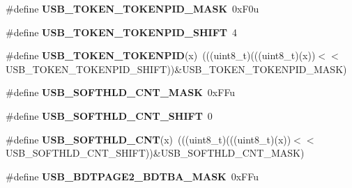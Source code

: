 \begin{DoxyCompactItemize}
\item 
\mbox{\label{group___u_s_b___register___masks_ga8880174ec35cfb684d2bcc6e0d5a52bc}} 
\#define {\bfseries U\+S\+B\+\_\+\+T\+O\+K\+E\+N\+\_\+\+T\+O\+K\+E\+N\+P\+I\+D\+\_\+\+M\+A\+SK}~0x\+F0u
\item 
\mbox{\label{group___u_s_b___register___masks_gae410fcf426d2212be6468703734f6ed9}} 
\#define {\bfseries U\+S\+B\+\_\+\+T\+O\+K\+E\+N\+\_\+\+T\+O\+K\+E\+N\+P\+I\+D\+\_\+\+S\+H\+I\+FT}~4
\item 
\mbox{\label{group___u_s_b___register___masks_ga74fd206a0132343b30c41a2184f18ea0}} 
\#define {\bfseries U\+S\+B\+\_\+\+T\+O\+K\+E\+N\+\_\+\+T\+O\+K\+E\+N\+P\+ID}(x)~(((uint8\+\_\+t)(((uint8\+\_\+t)(x))$<$$<$U\+S\+B\+\_\+\+T\+O\+K\+E\+N\+\_\+\+T\+O\+K\+E\+N\+P\+I\+D\+\_\+\+S\+H\+I\+FT))\&U\+S\+B\+\_\+\+T\+O\+K\+E\+N\+\_\+\+T\+O\+K\+E\+N\+P\+I\+D\+\_\+\+M\+A\+SK)
\item 
\mbox{\label{group___u_s_b___register___masks_gab71f8a7be8b025453facbce8d45b7bcc}} 
\#define {\bfseries U\+S\+B\+\_\+\+S\+O\+F\+T\+H\+L\+D\+\_\+\+C\+N\+T\+\_\+\+M\+A\+SK}~0x\+F\+Fu
\item 
\mbox{\label{group___u_s_b___register___masks_gaf4b663b6276ba642abfdedf79fac92c6}} 
\#define {\bfseries U\+S\+B\+\_\+\+S\+O\+F\+T\+H\+L\+D\+\_\+\+C\+N\+T\+\_\+\+S\+H\+I\+FT}~0
\item 
\mbox{\label{group___u_s_b___register___masks_ga6a373b5dfe5c4aa910fd120cc169a4b9}} 
\#define {\bfseries U\+S\+B\+\_\+\+S\+O\+F\+T\+H\+L\+D\+\_\+\+C\+NT}(x)~(((uint8\+\_\+t)(((uint8\+\_\+t)(x))$<$$<$U\+S\+B\+\_\+\+S\+O\+F\+T\+H\+L\+D\+\_\+\+C\+N\+T\+\_\+\+S\+H\+I\+FT))\&U\+S\+B\+\_\+\+S\+O\+F\+T\+H\+L\+D\+\_\+\+C\+N\+T\+\_\+\+M\+A\+SK)
\item 
\mbox{\label{group___u_s_b___register___masks_ga69407c90a73a26bc60f3f9b75e4bd7c0}} 
\#define {\bfseries U\+S\+B\+\_\+\+B\+D\+T\+P\+A\+G\+E2\+\_\+\+B\+D\+T\+B\+A\+\_\+\+M\+A\+SK}~0x\+F\+Fu
\item 
\mbox{\label{group___u_s_b___register___masks_gae67d0252b1559f854264f0fe52ff6fb5}} 

\end{DoxyCompactItemize}
